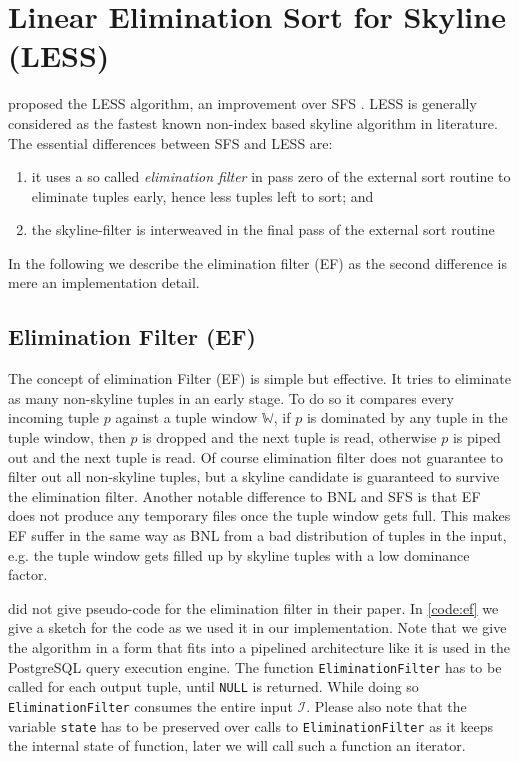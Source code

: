 \section{Linear Elimination Sort for Skyline (LESS)}
\citet{Godfrey2005} proposed the LESS algorithm, an improvement
over SFS \citep{Chomicki2003}. LESS is generally considered as the fastest
known non-index based skyline algorithm in literature. The essential
differences between SFS and LESS are:

\begin{enumerate}
\item 
it uses a so called \emph{elimination filter} in pass zero of the
external sort routine to eliminate tuples early, hence less tuples left
to sort; and
\item
the skyline-filter is interweaved in the final pass of the external
sort routine
\end{enumerate}

In the following we describe the elimination filter (EF) as the second
difference is mere an implementation detail.

\subsection{Elimination Filter (EF)}
\label{sec:ef-tuple-order}
The concept of elimination Filter (EF) is simple but effective.  It
tries to eliminate as many non-skyline tuples in an early stage.  To
do so it compares every incoming tuple $p$ against a tuple window
$\mathbb{W}$, if $p$ is dominated by any tuple in the tuple window,
then $p$ is dropped and the next tuple is read, otherwise $p$ is piped
out and the next tuple is read.  Of course elimination filter does not
guarantee to filter out all non-skyline tuples, but a skyline candidate
is guaranteed to survive the elimination filter.  Another notable
difference to BNL and SFS is that EF does not produce any temporary
files once the tuple window gets full.  This makes EF suffer in the
same way as BNL from a bad distribution of tuples in the input, e.g.
the tuple window gets filled up by skyline tuples with a low dominance
factor.

\citet{Godfrey2005} did not give pseudo-code for the elimination
filter in their paper. In \autoref{code:ef} we give a sketch for
the code as we used it in our implementation. Note that we give
the algorithm in a form that fits into a pipelined architecture like
it is used in the PostgreSQL query execution engine. The function
\texttt{EliminationFilter} has to be called for each output tuple,
until \texttt{NULL} is returned. While doing so
\texttt{EliminationFilter} consumes the entire input $\mathcal{I}$.
Please also note that the variable \texttt{state} has to be preserved
over calls to \texttt{EliminationFilter} as it keeps the internal
state of function, later we will call such a function an iterator.

